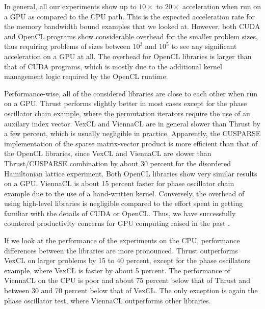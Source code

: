 \documentclass[final]{siamltex}
\begin{document}
In general, all our experiments show up to $10\times$ to $20\times$ acceleration
when run on a GPU as compared to the CPU path. This is the expected acceleration
rate for the memory bandwidth bound examples that we looked at. However, both CUDA and OpenCL
programs show considerable overhead for the smaller problem sizes,
thus requiring problems of sizes between $10^3$ and $10^5$ to see any significant acceleration on
a GPU at all. The overhead for OpenCL libraries is larger than that of CUDA programs,
which is mostly due to the additional kernel management logic required by the OpenCL runtime.

Performance-wise, all of the considered libraries are close to each other when
run on a GPU.  Thrust performs slightly better in most cases except for the phase oscillator chain example,
where the permutation iterators require the use of an auxilary index vector.
VexCL and ViennaCL are in general slower than Thrust by a few percent, which is usually negligible in practice.
Apparently, the CUSPARSE implementation of the sparse matrix-vector product is more efficient than that of the OpenCL
libraries, since VexCL and ViennaCL are slower than Thrust/CUSPARSE combination
by about 30 percent for the disordered Hamiltonian lattice experiment. Both 
OpenCL libraries show very similar results on a GPU. ViennaCL is about 15 percent faster for
phase oscillator chain example due to the use of a hand-written kernel.
Conversely, the overhead of using high-level libraries is negligible compared to the effort spent in getting familiar with the details of CUDA or OpenCL.
Thus, we have successfully countered productivity concerns for GPU computing raised in the past \cite{bordawekar:gpu-productivity}.

If we look at the performance of the experiments on the CPU, performance
differences between the libraries are more pronounced. Thrust outperforms
VexCL on larger problems by 15 to 40 percent, except for the phase
oscillators example, where VexCL is faster by about 5 percent.
The performance of ViennaCL on the CPU is poor and about 75 percent below that of Thrust and between 30 and 70 percent below that of VexCL.
The only exception is again the phase oscillator test, where ViennaCL outperforms other libraries.
\end{document}
